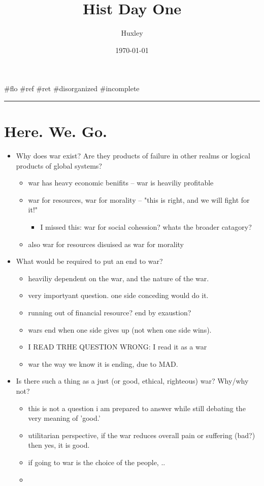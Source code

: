 \documentclass[letterpaper]{article}
\author{Huxley}
\date{\today}
\title{Hist Day One}
\renewcommand{\tableofcontents}{}
\begin{document}
\tableofcontents

\#flo \#ref \#ret \#disorganized \#incomplete

\noindent\rule{\textwidth}{0.5pt}

\section{Here. We. Go.}
\label{sec:org0bac962}
\begin{itemize}
\item Why does war exist? Are they products of failure in other realms or
logical products of global systems?

\begin{itemize}
\item war has heavy economic benifits -- war is heaviliy profitable
\item war for resources, war for morality -- "this is right, and we will
fight for it!"

\begin{itemize}
\item I missed this: war for social cohession? whats the broader
catagory?
\end{itemize}

\item also war for resources disuised as war for morality
\end{itemize}

\item What would be required to put an end to war?

\begin{itemize}
\item heaviliy dependent on the war, and the nature of the war.

\item very importyant question. one side conceding would do it.

\item running out of financial resource? end by exaustion?

\item wars end when one side gives up (not when one side wins).

\item I READ TRHE QUESTION WRONG: I read it as a war

\item war the way we know it is ending, due to MAD.
\end{itemize}

\item Is there such a thing as a just (or good, ethical, righteous) war?
Why/why not?

\begin{itemize}
\item this is not a question i am prepared to answer while still debating
the very meaning of 'good.'
\item utilitarian perspective, if the war reduces overall pain or
suffering (bad?) then yes, it is good.
\item if going to war is the choice of the people, ..
\item 
\end{itemize}
\end{itemize}
\end{document}
